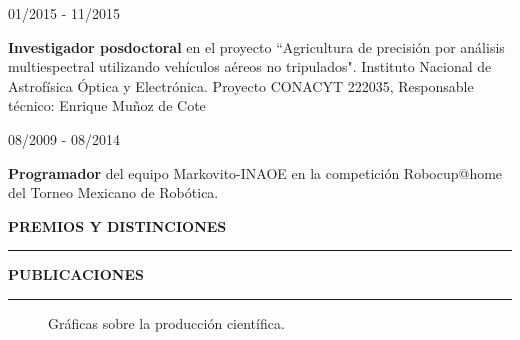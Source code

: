 \documentclass[10pt]{article}
\begin{document}
\begin{minipage}{1.5 in}
	01/2015 - 11/2015\\
\end{minipage}
\begin{minipage}{4.5in}
	\textbf{Investigador posdoctoral} en el proyecto ``Agricultura de precisión por análisis multiespectral
	utilizando vehículos aéreos no tripulados". Instituto Nacional de Astrofísica Óptica y Electrónica. Proyecto CONACYT 222035, Responsable técnico: Enrique Muñoz de Cote\\ 
\end{minipage}

\begin{minipage}{1.5 in}
08/2009 - 08/2014\\
\end{minipage}
\begin{minipage}{4.5in}
\textbf{Programador} del equipo Markovito-INAOE en la competición Robocup@home del Torneo Mexicano de Robótica.\\ 
\end{minipage}

{\bf PREMIOS Y DISTINCIONES}
\vspace{3pt}
\hrule
 

{\bf PUBLICACIONES}
\vspace{3pt}
\hrule

\begin{figure}[t]
	\caption{Gráficas sobre la producción científica.}
	\label{fig:dummy}
\end{figure}
\end{document}
